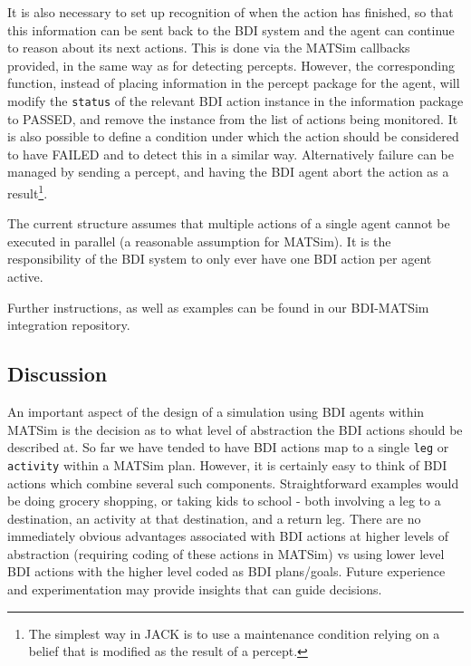 It is also necessary to set up recognition of when the action has
finished, so that this information can be sent back to the BDI system
and the agent can continue to reason about its next actions.  This is
done via the MATSim callbacks provided, in the same way as for
detecting percepts. However, the corresponding function, instead of
placing information in the percept package for the agent, will modify
the \texttt{status} of the relevant BDI action instance in the
information package to PASSED, and remove the instance from the list
of actions being monitored. It is also possible to define a condition
under which the action should be considered to have FAILED
and to detect this in a similar way. Alternatively failure can be
managed by sending a percept, and having the BDI agent abort the
action as a result\footnote{The simplest way in JACK is to use a
  maintenance condition relying on a belief that is modified as the
  result of a percept.}.

The current structure assumes that multiple actions of a single agent
cannot be executed in parallel (a reasonable assumption for
MATSim). It is the responsibility of the BDI system to only ever have
one BDI action per agent active.

Further instructions, as well as examples can be found in our
BDI-MATSim integration repository.

\subsection{Discussion}
An important aspect of the design of a simulation using BDI agents
within MATSim is the decision as to what level of abstraction the BDI
actions should be described at. So far we have tended to have BDI
actions map to a single \texttt{leg} or \texttt{activity} within a
MATSim plan. However, it is certainly easy to think of BDI actions
which combine several such components. Straightforward examples would
be doing grocery shopping, or taking kids to school - both involving a
leg to a destination, an activity at that destination, and a return
leg. There are no immediately obvious advantages associated with BDI
actions at higher levels of abstraction (requiring coding of these
actions in MATSim) vs using lower level BDI actions with the higher
level coded as BDI plans/goals. Future experience and experimentation
may provide insights that can guide decisions.

